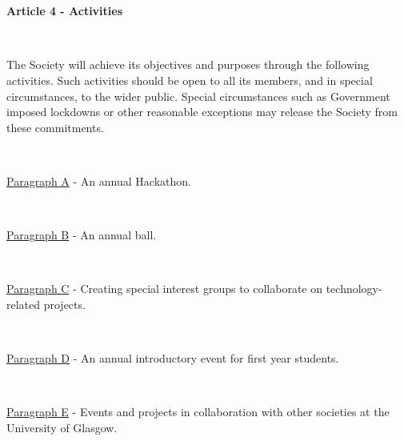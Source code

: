 ~

~

\large{\textbf{Article 4 - Activities}}

~

The Society will achieve its objectives and purposes through the
following activities. Such activities should be open to all
its members, and in special circumstances, to the wider public.
Special circumstances such as Government imposed lockdowns or 
other reasonable exceptions may release the Society 
from these commitments.


~

\underline{Paragraph A} - An annual Hackathon.

~

\underline{Paragraph B} - An annual ball.

~

\underline{Paragraph C} - Creating special interest groups to
collaborate on technology-related projects.

~

\underline{Paragraph D} - An annual introductory event for first year
students.

~

\underline{Paragraph E} - Events and projects in collaboration with
other societies at the University of Glasgow.